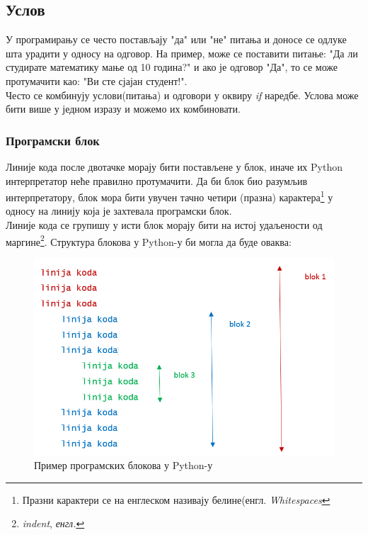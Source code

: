 \subsection{Услов}
		У програмирању се често постављају "да" или "не" питања и доносе се одлуке шта урадити у односу на одговор. На пример, може се поставити питање: "Да ли студирате математику мање од 10 година?" и ако је одговор "Да", то се може протумачити као: "Ви сте сјајан студент!".\\
		Често се комбинују услови(питања) и одговори у оквиру \emph{if} наредбе. Услова може бити више у једном изразу и можемо их комбиновати. 
		
		\subsubsection{Програмски блок}
		Линије кода после двотачке морају бити постављене у блок, иначе их Python интерпретатор неће правилно протумачити. Да би блок био разумљив интерпретатору, блок мора бити увучен тачно четири (празна) карактера\footnote{Празни карактери се на енглеском називају белине(енгл. \emph{Whitespaces}}  у односу на линију која је захтевала програмски блок\cite{PEP}.\\
		Линије кода се групишу у исти блок морају бити на истој удаљености од маргине\footnote{\emph{indent}, \emph{енгл.}}. Структура блокова у Python-у би могла да буде оваква:\\
		\begin{figure}[here]
		\centering
		\includegraphics[scale=0.5]{whitespace.png}
		\caption{Пример програмских блокова у Python-у}
		\label{slike:whitespace}
		\end{figure}
		
